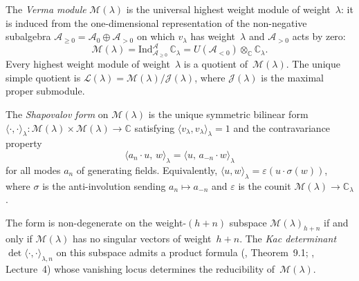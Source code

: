 \begin{definition}\label{def:verma-module}
The \emph{Verma module} $\mathcal{M}(\lambda)$ is the universal highest
weight module of weight~$\lambda$: it is induced from the one-dimensional
representation of the non-negative subalgebra
$\mathcal{A}_{\geq 0} = \mathcal{A}_0 \oplus \mathcal{A}_{>0}$ on which
$v_\lambda$ has weight~$\lambda$ and $\mathcal{A}_{>0}$ acts by zero:
\[
\mathcal{M}(\lambda)
= \mathrm{Ind}_{\mathcal{A}_{\geq 0}}^{\mathcal{A}}\,\mathbb{C}_\lambda
= U(\mathcal{A}_{<0}) \otimes_\mathbb{C} \mathbb{C}_\lambda.
\]
Every highest weight module of weight~$\lambda$ is a quotient
of~$\mathcal{M}(\lambda)$. The unique simple quotient is
$\mathcal{L}(\lambda) = \mathcal{M}(\lambda) / \mathcal{J}(\lambda)$,
where $\mathcal{J}(\lambda)$ is the maximal proper submodule.
\end{definition}

\begin{definition}\label{def:shapovalov-form}
The \emph{Shapovalov form} on $\mathcal{M}(\lambda)$ is the unique
symmetric bilinear form
$\langle\cdot,\cdot\rangle_\lambda \colon
\mathcal{M}(\lambda) \times \mathcal{M}(\lambda) \to \mathbb{C}$
satisfying $\langle v_\lambda, v_\lambda \rangle_\lambda = 1$ and
the contravariance property
\[
\langle a_n \cdot u,\, w \rangle_\lambda
= \langle u,\, a_{-n} \cdot w \rangle_\lambda
\]
for all modes $a_n$ of generating fields. Equivalently, $\langle u, w
\rangle_\lambda = \varepsilon(u \cdot \sigma(w))$, where $\sigma$ is the
anti-involution sending $a_n \mapsto a_{-n}$ and $\varepsilon$ is the
counit $\mathcal{M}(\lambda) \to \mathbb{C}_\lambda$.

The form is non-degenerate on the weight-$(h{+}n)$ subspace
$\mathcal{M}(\lambda)_{h+n}$ if and only if $\mathcal{M}(\lambda)$ has
no singular vectors of weight~$h{+}n$. The \emph{Kac determinant}
$\det\langle\cdot,\cdot\rangle_{\lambda,n}$ on this subspace admits a
product formula (\cite{Kac}, Theorem~9.1; \cite{KR87}, Lecture~4) whose
vanishing locus determines the reducibility of~$\mathcal{M}(\lambda)$.
\end{definition}

